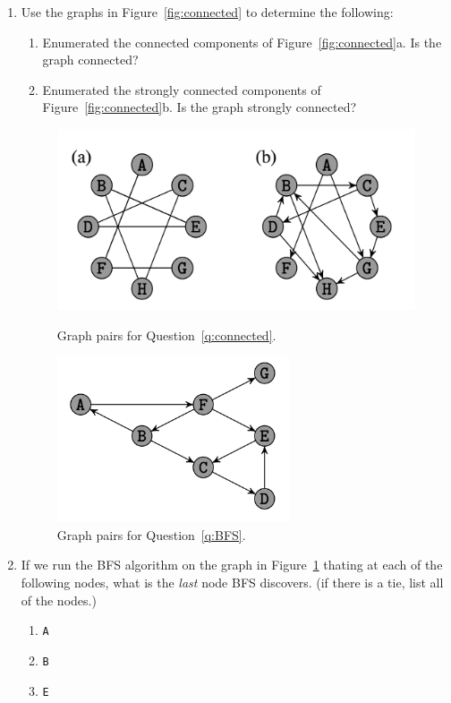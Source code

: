 \documentclass[11pt, oneside]{article}   	%
\begin{document}
\begin{enumerate}
\item \label{q:connected} Use the graphs in Figure~\ref{fig:connected} to determine the following:
\begin{enumerate}
\item Enumerated the connected components of Figure~\ref{fig:connected}a. Is the graph connected?
\item Enumerated the strongly connected components of Figure~\ref{fig:connected}b. Is the graph strongly connected?
\end{enumerate}


\begin{figure}
\centering
\begin{minipage}{.5\textwidth}
\centering
\includegraphics[width=\textwidth]{connected}
\caption{Graph pairs for Question~\ref{q:connected}.}
\label{fig:connected}
\end{minipage}%
\begin{minipage}{.5\textwidth}
\centering
\includegraphics[width=0.65\textwidth]{BFS}
\caption{Graph pairs for Question~\ref{q:BFS}.}
\label{fig:BFS}
\end{minipage}%
\end{figure}

\item \label{q:BFS} If we run the BFS algorithm on the graph in Figure~\ref{fig:BFS} thating at each of the following nodes, what is the \emph{last} node BFS discovers. 
(if there is a tie, list all of the nodes.)
\begin{enumerate}
\item \texttt{A}
\item \texttt{B}
\item \texttt{E}
\end{enumerate}


\end{enumerate}
\end{document}
